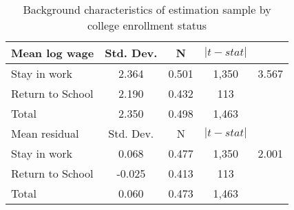 \begin{table}[ht]
\caption{Background characteristics of estimation sample by college enrollment status}
\label{tab:sumStatsPost}
\centering
\begin{threeparttable}
\begin{tabular}{lcccc}
\toprule 
Mean log wage & Std. Dev. & N & $|t-stat|$ \\
\midrule 
Stay in work     & 2.364 & 0.501 &   1,350 & 3.567 \\ 
Return to School   & 2.190 & 0.432 &     113 &  \\ 
\midrule 
Total     & 2.350 & 0.498 &   1,463 &  \\ 
\midrule 
Mean residual & Std. Dev. & N & $|t-stat|$ \\
Stay in work     & 0.068 & 0.477 &   1,350 & 2.001 \\ 
Return to School   & -0.025 & 0.413 &     113 &  \\ 
\midrule 
Total     & 0.060 & 0.473 &   1,463 &  \\ 
\bottomrule 
\end{tabular} 
\end{threeparttable} 
\end{table} 
